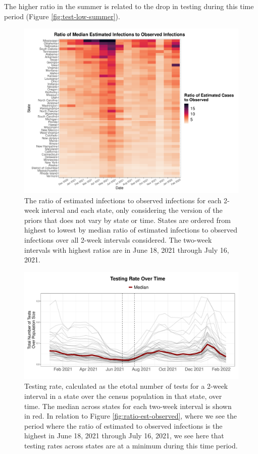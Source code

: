 \documentclass[12pt,twoside]{smiththesis}
\begin{document}
The higher ratio in the summer is related to the drop in testing during this time period (Figure \ref{fig:test-low-summer}).
\begin{figure}
\includegraphics[width=1\linewidth]{figure/heatmap_ratio_est_observed} \caption{\label{fig:ratio-est-observed} The ratio of estimated infections to observed infections for each 2-week interval and each state, only considering the version of the priors that does not vary by state or time. States are ordered from highest to lowest by median ratio of estimated infections to observed infections over all 2-week intervals considered. The two-week intervals with highest ratios are in June 18, 2021 through July 16, 2021.}\label{fig:unnamed-chunk-83}
\end{figure}
\begin{figure}
\includegraphics[width=0.8\linewidth]{figure/testrate-low-summer} \caption{\label{fig:test-low-summer}Testing rate, calculated as the etotal number of tests for a 2-week interval in a state over the census population in that state, over time. The median across states for each two-week interval is shown in red. In relation to Figure \ref{fig:ratio-est-observed}, where we see the period where the ratio of estimated to observed infections is the highest in June 18, 2021 through July 16, 2021, we see here that testing rates across states are at a minimum during this time period.}\label{fig:unnamed-chunk-84}
\end{figure}
\end{document}
